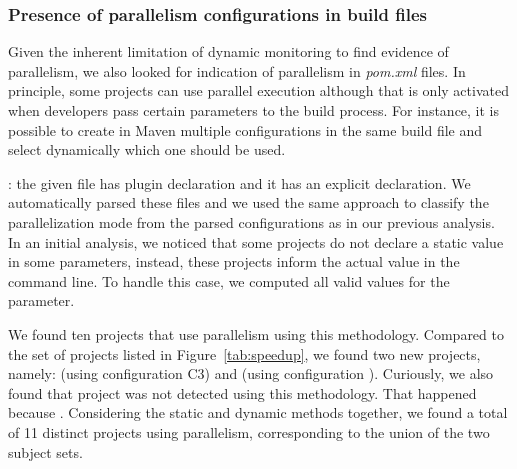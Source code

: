 \subsubsection{Presence of parallelism configurations in build files}
\label{sec:rqC-2}
Given the inherent limitation of dynamic monitoring to find evidence
of parallelism, we also looked for indication of parallelism in
\emph{pom.xml} files. In principle, some projects can use parallel execution
although that is only activated when developers pass certain
parameters to the build process. For instance, it is possible to
create in Maven multiple configurations in the same build file and
select dynamically which one should be used.

: the given \pomf{} file has
 plugin declaration and it has an
explicit  declaration. We automatically parsed
these  files and we used the same approach to classify the
parallelization mode from the parsed configurations as in our previous
analysis. In an initial analysis, we noticed that some projects do not
declare a static value in some parameters, instead, these projects
inform the actual value in the command line. To handle this case, we
computed all valid values for the parameter.

We found ten projects that use parallelism using this methodology.
Compared to the set of projects listed in Figure~\ref{tab:speedup}, we
found two new projects, namely:  (using configuration C3) and
 (using configuration \ForkSeq{}).  Curiously, we
also found that project  was not detected using this
methodology.  That happened because .
Considering the static and dynamic methods together, we found a total
of 11 distinct projects using parallelism, corresponding to the union
of the two subject sets.

\begin{center}
\end{center}

